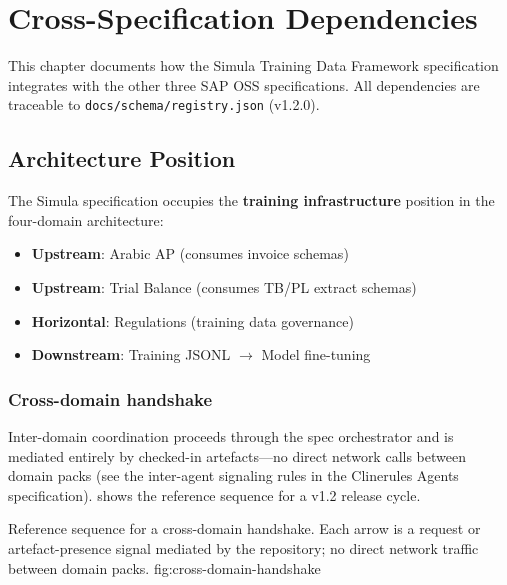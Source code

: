 
\chapter{Cross-Specification Dependencies}
\label{ch:cross-spec}

This chapter documents how the Simula Training Data Framework specification
integrates with the other three SAP OSS specifications. All dependencies
are traceable to \texttt{docs/schema/registry.json} (v1.2.0).

\section{Architecture Position}
\label{sec:arch-position}

The Simula specification occupies the \textbf{training infrastructure} position
in the four-domain architecture:

\begin{itemize}
  \item \textbf{Upstream}: Arabic AP (consumes invoice schemas)
  \item \textbf{Upstream}: Trial Balance (consumes TB/PL extract schemas)
  \item \textbf{Horizontal}: Regulations (training data governance)
  \item \textbf{Downstream}: Training JSONL $\rightarrow$ Model fine-tuning
\end{itemize}

\subsection{Cross-domain handshake}
\label{sec:cross-domain-handshake}

Inter-domain coordination proceeds through the spec orchestrator and is
mediated entirely by checked-in artefacts---no direct network calls between
domain packs (see the inter-agent signaling rules in the Clinerules Agents
specification).  shows the reference sequence
for a v1.2 release cycle.

%
  {Reference sequence for a cross-domain handshake. Each arrow is a
    request or artefact-presence signal mediated by the repository; no direct
    network traffic between domain packs.}%
  {fig:cross-domain-handshake}

